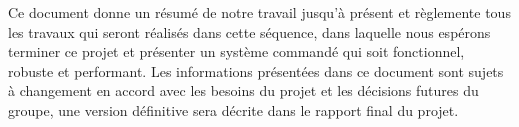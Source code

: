 Ce document donne un résumé de notre travail jusqu’à présent et règlemente tous
les travaux qui seront réalisés dans cette séquence, dans laquelle nous espérons
terminer ce projet et présenter un système commandé qui soit fonctionnel, robuste
et performant. Les informations présentées dans ce document sont sujets à
changement en accord avec les besoins du projet et les décisions futures du groupe,
une version définitive sera décrite dans le rapport final du projet.